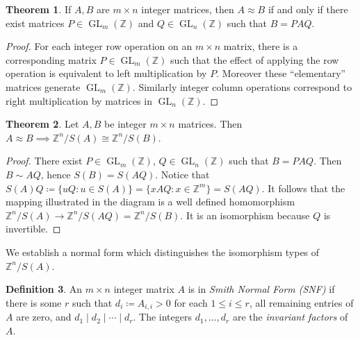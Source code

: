 \documentclass[12pt,a4paper]{article}
\newcommand{\Z}{\mathbb{Z}}
\DeclareMathOperator{\GL}{GL}
\theoremstyle{definition}
\newtheorem{theorem}{Theorem}[section]
\newtheorem{definition}[theorem]{Definition}
\begin{document}
\begin{theorem}
  If $A,B$ are $m\times n$ integer matrices, then $A\approx B$ if and only if there exist matrices $P\in\GL_m(\Z)$ and $Q\in\GL_n(\Z)$ such that $B=PAQ$.
\end{theorem}

\begin{proof}
  For each integer row operation on an $m\times n$ matrix, there is a corresponding matrix $P\in\GL_m(\Z)$ such that the effect of applying the row operation is equivalent to left multiplication by $P$. Moreover these ``elementary'' matrices generate $\GL_m(\Z)$. Similarly integer column operations correspond to right multiplication by matrices in $\GL_n(\Z)$.
\end{proof}

\begin{theorem}
  Let $A,B$ be integer $m\times n$ matrices. Then $A\approx B\implies \Z^n/S(A)\cong\Z^n/S(B)$.
\end{theorem}

\begin{proof}
  There exist $P\in\GL_m(\Z)$, $Q\in\GL_n(\Z)$ such that $B=PAQ$. Then $B\sim AQ$, hence $S(B)=S(AQ)$. Notice that $S(A)Q\coloneqq\{uQ : u\in S(A)\}=\{xAQ : x\in\Z^m\}=S(AQ)$. It follows that the mapping illustrated in the diagram is a well defined homomorphism $\Z^n/S(A)\to\Z^n/S(AQ)=\Z^n/S(B)$. It is an isomorphism because $Q$ is invertible.

  \centering

\end{proof}

We establish a normal form which distinguishes the isomorphism types of $\Z^n/S(A)$.

\begin{definition}
  An $m\times n$ integer matrix $A$ is in \emph{Smith Normal Form (SNF)} if there is some $r$ such that $d_i\coloneqq A_{i,i}>0$ for each $1\leq i\leq r$, all remaining entries of $A$ are zero, and $d_1\mid d_2\mid \cdots \mid d_r$. The integers $d_1,\ldots,d_r$ are the \emph{invariant factors} of $A$.
\end{definition}
\end{document}
